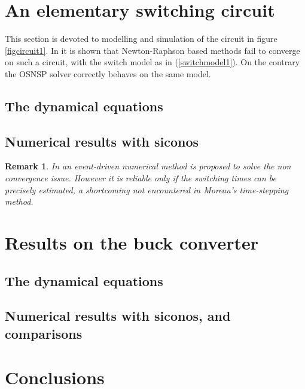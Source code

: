 \documentclass{article}
\newtheorem{remark}{Remark}
\begin{document}
\section{An elementary switching circuit}
\label{section3}


This section is devoted to modelling and simulation of the circuit in figure \ref{figcircuit1}. In \cite{maffezzoni2006} it is shown that Newton-Raphson based methods fail to converge on such a circuit, with the switch model as in (\ref{switchmodel1}). On the contrary the OSNSP solver correctly behaves on the same model.  


\subsection{The dynamical equations}
\label{section31}



\subsection{Numerical results with {\sc siconos}}
\label{section32}




\begin{remark}
In \cite{maffezzoni2006} an event-driven numerical method is proposed to solve the non convergence issue. However it is reliable only if the switching times can be precisely estimated, a shortcoming not encountered  in Moreau's time-stepping method. 
\end{remark}





\section{Results on the buck converter}
\label{section4}


\subsection{The dynamical equations}
\label{section41}


\subsection{Numerical results with {\sc siconos},  and comparisons}
\label{section42}



\section{Conclusions}
\label{section5}
\end{document}

